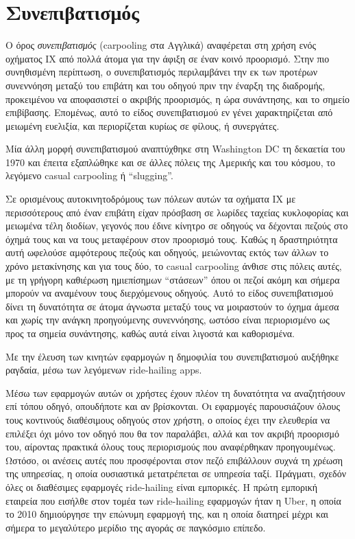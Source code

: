 \documentclass[../thesis.tex]{subfiles}
\begin{document}
\section{Συνεπιβατισμός}
Ο όρος \textit{συνεπιβατισμός} (carpooling στα Αγγλικά) αναφέρεται στη χρήση ενός οχήματος ΙΧ από πολλά άτομα για την άφιξη σε έναν κοινό προορισμό.
Στην πιο συνηθισμένη περίπτωση, ο συνεπιβατισμός περιλαμβάνει την εκ των προτέρων συνεννόηση μεταξύ του επιβάτη και του οδηγού πριν την έναρξη της διαδρομής, προκειμένου να αποφασιστεί ο ακριβής προορισμός, η ώρα συνάντησης, και το σημείο επιβίβασης.
Επομένως, αυτό το είδος συνεπιβατισμού εν γένει χαρακτηρίζεται από μειωμένη ευελιξία, και περιορίζεται κυρίως σε φίλους, ή συνεργάτες.

\bigskip

Μία άλλη μορφή συνεπιβατισμού αναπτύχθηκε στη Washington DC τη δεκαετία του 1970 και έπειτα εξαπλώθηκε και σε άλλες πόλεις της Αμερικής και του κόσμου, το λεγόμενο casual carpooling ή ``slugging''.

Σε ορισμένους αυτοκινητοδρόμους των πόλεων αυτών τα οχήματα ΙΧ με περισσότερους από έναν επιβάτη είχαν πρόσβαση σε λωρίδες ταχείας κυκλοφορίας και μειωμένα τέλη διοδίων, γεγονός που έδινε κίνητρο σε οδηγούς να δέχονται πεζούς στο όχημά τους και να τους μεταφέρουν στον προορισμό τους\cite{SHAHEEN2016165}.
Καθώς η δραστηριότητα αυτή ωφελούσε αμφότερους πεζούς και οδηγούς, μειώνοντας εκτός των άλλων το χρόνο μετακίνησης και για τους δύο, το casual carpooling άνθισε στις πόλεις αυτές, με τη γρήγορη καθιέρωση ημιεπίσημων ``στάσεων'' όπου οι πεζοί ακόμη και σήμερα μπορούν να αναμένουν τους διερχόμενους οδηγούς.
Αυτό το είδος συνεπιβατισμού δίνει τη δυνατότητα σε άτομα άγνωστα μεταξύ τους να μοιραστούν το όχημα άμεσα και χωρίς την ανάγκη προηγούμενης συνεννόησης, ωστόσο είναι περιορισμένο ως προς τα σημεία συνάντησης, καθώς αυτά είναι λιγοστά και καθορισμένα.

\bigskip

Με την έλευση των κινητών εφαρμογών η δημοφιλία του συνεπιβατισμού αυξήθηκε ραγδαία, μέσω των λεγόμενων ride-hailing apps.

Μέσω των εφαρμογών αυτών οι χρήστες έχουν πλέον τη δυνατότητα να αναζητήσουν επί τόπου οδηγό, οπουδήποτε και αν βρίσκονται.
Οι εφαρμογές παρουσιάζουν όλους τους κοντινούς διαθέσιμους οδηγούς στον χρήστη, ο οποίος έχει την ελευθερία να επιλέξει όχι μόνο τον οδηγό που θα τον παραλάβει, αλλά και τον ακριβή προορισμό του, αίροντας πρακτικά όλους τους περιορισμούς που αναφέρθηκαν προηγουμένως.
Ωστόσο, οι ανέσεις αυτές που προσφέρονται στον πεζό επιβάλλουν συχνά τη χρέωση της υπηρεσίας, η οποία ουσιαστικά μετατρέπεται σε υπηρεσία ταξί.
Πράγματι, σχεδόν όλες οι διαθέσιμες εφαρμογές ride-hailing είναι εμπορικές.
Η πρώτη εμπορική εταιρεία που εισήλθε στον τομέα των ride-hailing εφαρμογών ήταν η Uber, η οποία το 2010 δημιούργησε την επώνυμη εφαρμογή της, και η οποία διατηρεί μέχρι και σήμερα το μεγαλύτερο μερίδιο της αγοράς σε παγκόσμιο επίπεδο.
\end{document}
